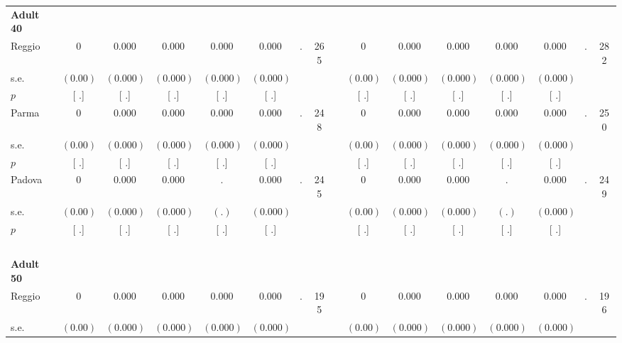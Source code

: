 \begin{longtable}{L{8em} c c c c c c c p{1em} c c c c c c c}
\quad \quad \textbf{Adult 40} & & & & & & & & & & & & & & & \\* 
\quad \quad \quad Reggio& 0 &     0.000 &     0.000 &     0.000 &     0.000 &         . &       265 & & 0 &     0.000 &     0.000 &     0.000 &     0.000 &         . &       282  \\*
\quad \quad \quad \quad s.e.& $ (     0.00)$ & $ (    0.000)$ & $ (    0.000)$ & $ (    0.000)$ & $ (    0.000)$ & & & & $ (     0.00)$ & $ (    0.000)$ & $ (    0.000)$ & $ (    0.000)$ & $ (    0.000)$ & &  \\*
\quad \quad \quad \quad $ p$ & [        .] & [        .] & [        .] & [        .] & [        .] & & & & [        .] & [        .] & [        .] & [        .] & [        .] & &  \\[1em]
\quad \quad \quad Parma& 0 &     0.000 &     0.000 &     0.000 &     0.000 &         . &       248 & & 0 &     0.000 &     0.000 &     0.000 &     0.000 &         . &       250  \\*
\quad \quad \quad \quad s.e.& $ (     0.00)$ & $ (    0.000)$ & $ (    0.000)$ & $ (    0.000)$ & $ (    0.000)$ & & & & $ (     0.00)$ & $ (    0.000)$ & $ (    0.000)$ & $ (    0.000)$ & $ (    0.000)$ & &  \\*
\quad \quad \quad \quad $ p$ & [        .] & [        .] & [        .] & [        .] & [        .] & & & & [        .] & [        .] & [        .] & [        .] & [        .] & &  \\[1em]
\quad \quad \quad Padova& 0 &     0.000 &     0.000 &         . &     0.000 &         . &       245 & & 0 &     0.000 &     0.000 &         . &     0.000 &         . &       249  \\*
\quad \quad \quad \quad s.e.& $ (     0.00)$ & $ (    0.000)$ & $ (    0.000)$ & $ (        .)$ & $ (    0.000)$ & & & & $ (     0.00)$ & $ (    0.000)$ & $ (    0.000)$ & $ (        .)$ & $ (    0.000)$ & &  \\*
\quad \quad \quad \quad $ p$ & [        .] & [        .] & [        .] & [        .] & [        .] & & & & [        .] & [        .] & [        .] & [        .] & [        .] & &  \\[1em]
~\\[1em]
\quad \quad \textbf{Adult 50} & & & & & & & & & & & & & & & \\* 
\quad \quad \quad Reggio& 0 &     0.000 &     0.000 &     0.000 &     0.000 &         . &       195 & & 0 &     0.000 &     0.000 &     0.000 &     0.000 &         . &       196  \\*
\quad \quad \quad \quad s.e.& $ (     0.00)$ & $ (    0.000)$ & $ (    0.000)$ & $ (    0.000)$ & $ (    0.000)$ & & & & $ (     0.00)$ & $ (    0.000)$ & $ (    0.000)$ & $ (    0.000)$ & $ (    0.000)$ & &  \\*

\end{longtable}
